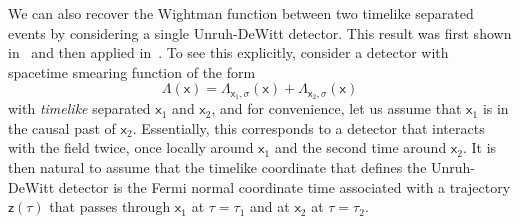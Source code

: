 \documentclass[letterpaper,12pt,titlepage,oneside,final]{book}
\newcommand{\mf}{\mathsf}%
\begin{document}
    We can also recover the Wightman function between two timelike separated events by considering a single Unruh-DeWitt detector. This result was first shown in~\cite{pipo} and then applied in~\cite{geometry}. To see this explicitly, consider a detector with spacetime smearing function of the form
    \begin{equation}
        \Lambda(\mf x) = \Lambda_{\mf x_1,\sigma}(\mf x)+\Lambda_{\mf x_2,\sigma}(\mf x)
    \end{equation}
    with \textit{timelike} separated $\mf x_1$ and $\mf x_2$, and for convenience, let us assume that $\mf x_1$ is in the causal past of $\mf x_2$. Essentially, this corresponds to a detector that interacts with the field twice, once locally around $\mf x_1$ and the second time around $\mf x_2$. It is then natural to assume that the timelike coordinate that defines the Unruh-DeWitt detector is the Fermi normal coordinate time associated with a trajectory $\mf z(\tau)$ that passes through $\mf x_1$ at $\tau = \tau_1$ and at $\mf x_2$ at $\tau = \tau_2$. 
    
\end{document}
